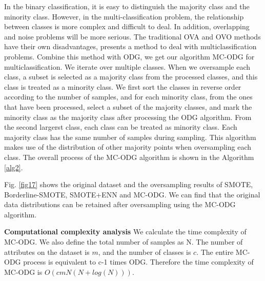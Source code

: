 \documentclass[ida]{iosart2x}
\begin{document}
 In the binary classification, 
it is easy to distinguish the majority class and the minority class. 
However, in the multi-classification problem, the relationship between
classes is more complex and difficult to deal.
In addition, overlapping and noise problems will be more serious.
The traditional OVA and OVO methods have their own disadvantages,  
\cite{2020Combined,2019Radial} presents a method to deal with multiclassification problems.
Combine this method with ODG, we get our algorithm MC-ODG for multiclassification.
We iterate over multiple classes. When we oversample each class,
a subset is selected as a majority class from the processed classes, 
and this class is treated as a minority class.
We first sort the classes in reverse order according to the number of samples, and for each minority class, 
from the ones that have been processed,
select a subset of the majority classes, and mark the minority class as the majority class 
after processing the ODG algorithm.
From the second largerst class, each class can be treated as minority class.
Each majority class has the same number of samples during sampling.
This algorithm makes use of the distribution of 
other majority points when oversampling each class.
The overall process of the MC-ODG algorithm is shown in the Algorithm \ref{alg2}.


 Fig. \ref{fig17} shows the original dataset and the oversampling results of SMOTE, Borderline-SMOTE,
 SMOTE+ENN and MC-ODG. We can find that the original data distributions 
 can be retained after oversampling using the MC-ODG algorithm.

 \textbf{Computational complexity analysis}
We calculate the time complexity of MC-ODG.
 We also define the total number of samples as N. The number of attributes on the dataset is $m$, and
 the number of classes is $c$. The entire MC-ODG process is equivalent to c-1 times ODG.
 Therefore the time complexity of MC-ODG is $O(cmN(N+log(N)))$.
\end{document}
